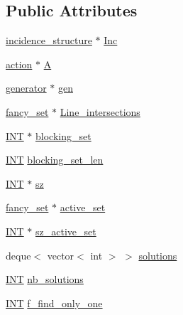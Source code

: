 \subsection*{Public Attributes}
\begin{DoxyCompactItemize}
\item 
\mbox{\hyperlink{classincidence__structure}{incidence\+\_\+structure}} $\ast$ \mbox{\hyperlink{classsearch__blocking__set_a93fa339b01d40f2ef959837b194dc8a8}{Inc}}
\item 
\mbox{\hyperlink{classaction}{action}} $\ast$ \mbox{\hyperlink{classsearch__blocking__set_a491c18c26a74e9a4d6d6ac3874fb1ed3}{A}}
\item 
\mbox{\hyperlink{classgenerator}{generator}} $\ast$ \mbox{\hyperlink{classsearch__blocking__set_a7e80148330f7bcfd2001de92c1f5ca1a}{gen}}
\item 
\mbox{\hyperlink{classfancy__set}{fancy\+\_\+set}} $\ast$ \mbox{\hyperlink{classsearch__blocking__set_a53668dbf4f0af3c3c268570d92b1b0ba}{Line\+\_\+intersections}}
\item 
\mbox{\hyperlink{galois_8h_a09fddde158a3a20bd2dcadb609de11dc}{I\+NT}} $\ast$ \mbox{\hyperlink{classsearch__blocking__set_a130817f753392f7ea5f1f0bfc6aa7d5c}{blocking\+\_\+set}}
\item 
\mbox{\hyperlink{galois_8h_a09fddde158a3a20bd2dcadb609de11dc}{I\+NT}} \mbox{\hyperlink{classsearch__blocking__set_a2d48af341341f3dbb054a49805690b17}{blocking\+\_\+set\+\_\+len}}
\item 
\mbox{\hyperlink{galois_8h_a09fddde158a3a20bd2dcadb609de11dc}{I\+NT}} $\ast$ \mbox{\hyperlink{classsearch__blocking__set_aafe272ad3370592d9dffde7e5cbbe116}{sz}}
\item 
\mbox{\hyperlink{classfancy__set}{fancy\+\_\+set}} $\ast$ \mbox{\hyperlink{classsearch__blocking__set_a8df720fcc3fced1737fbddbb7910bf4f}{active\+\_\+set}}
\item 
\mbox{\hyperlink{galois_8h_a09fddde158a3a20bd2dcadb609de11dc}{I\+NT}} $\ast$ \mbox{\hyperlink{classsearch__blocking__set_afead95cfc57413691d88d3388f5205c2}{sz\+\_\+active\+\_\+set}}
\item 
deque$<$ vector$<$ int $>$ $>$ \mbox{\hyperlink{classsearch__blocking__set_ab2e3c228a9e1aabf4de7a560b4d3a224}{solutions}}
\item 
\mbox{\hyperlink{galois_8h_a09fddde158a3a20bd2dcadb609de11dc}{I\+NT}} \mbox{\hyperlink{classsearch__blocking__set_a55acb18f57d750ad7c616b782af94ddd}{nb\+\_\+solutions}}
\item 
\mbox{\hyperlink{galois_8h_a09fddde158a3a20bd2dcadb609de11dc}{I\+NT}} \mbox{\hyperlink{classsearch__blocking__set_aac1d58231518c1897beca6b89b73c720}{f\+\_\+find\+\_\+only\+\_\+one}}

\end{DoxyCompactItemize}

